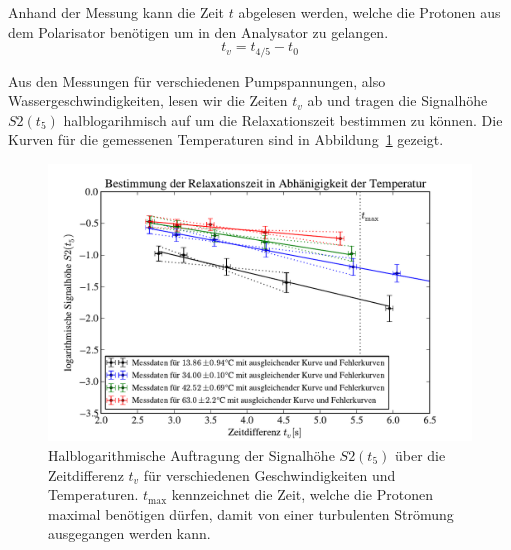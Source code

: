 \documentclass[paper=a4,
	fontsize=10pt,
	DIV=18,
	twocolumn,
	parskip=half
	]{scrartcl}
\numberwithin{equation}{section}    %
\begin{document}
Anhand der Messung kann die Zeit $t$ abgelesen werden, welche die Protonen aus dem Polarisator benötigen um in den Analysator zu gelangen.
\begin{equation}
	t_v = t_{4/5} - t_0
\end{equation}

Aus den Messungen für verschiedenen Pumpspannungen, also Wassergeschwindigkeiten, lesen wir die Zeiten $t_v$ ab und tragen die Signalhöhe $S2(t_5)$ halblogarihmisch auf um die Relaxationszeit bestimmen zu können. Die Kurven für die gemessenen Temperaturen sind in Abbildung~\ref{fig.relaxation} gezeigt.

\begin{figure}[htp]
	\begin{center}
		\includegraphics[width=\columnwidth]{Data-Plots/06-relaxation.pdf}
		\caption{Halblogarithmische Auftragung der Signalhöhe $S2(t_5)$ über die Zeitdifferenz $t_v$ für verschiedenen Geschwindigkeiten und Temperaturen. $t_\mathrm{max}$ kennzeichnet die Zeit, welche die Protonen maximal benötigen dürfen, damit von einer turbulenten Strömung ausgegangen werden kann.}
		\label{fig.relaxation}
	\end{center}
\end{figure}
\end{document}
